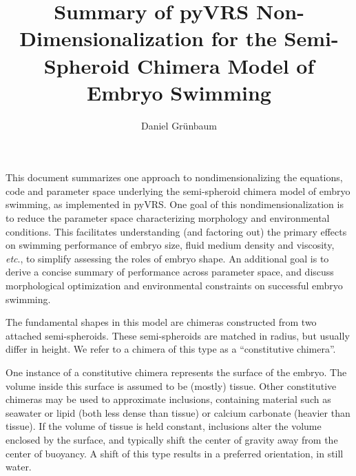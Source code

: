 \documentclass[10pt,a4paper]{article}
\title{Summary of pyVRS Non-Dimensionalization for the Semi-Spheroid Chimera Model of Embryo Swimming}
\author{Daniel Gr\"unbaum}
\def\etc{\emph{etc}.\xspace}
\begin{document}
\maketitle
This document summarizes one approach to nondimensionalizing the equations, code and parameter space underlying the semi-spheroid chimera model of embryo swimming, as implemented in pyVRS. 
One goal of this nondimensionalization is to reduce the parameter space characterizing morphology and environmental conditions. 
This facilitates understanding (and factoring out) the primary effects on swimming performance of embryo size, fluid medium density and viscosity, \etc, to simplify assessing the roles of embryo shape.
An additional goal is to derive a concise summary of performance across parameter space, and discuss morphological optimization and environmental constraints on successful embryo swimming.

The fundamental shapes in this model are chimeras constructed from two attached semi-spheroids. These semi-spheroids are matched in radius, but usually differ in height. 
We refer to a chimera of this type as a ``constitutive chimera''.

One instance of a constitutive chimera represents the surface of the embryo.
The volume inside this surface is assumed to be (mostly) tissue. 
Other constitutive chimeras may be used to approximate inclusions, containing material such as seawater or lipid (both less dense than tissue) or calcium carbonate (heavier than tissue).
If the volume of tissue is held constant, inclusions alter the volume enclosed by the surface, and typically shift the center of gravity away from the center of buoyancy.
A shift of this type results in a preferred orientation, in still water.
\end{document}
